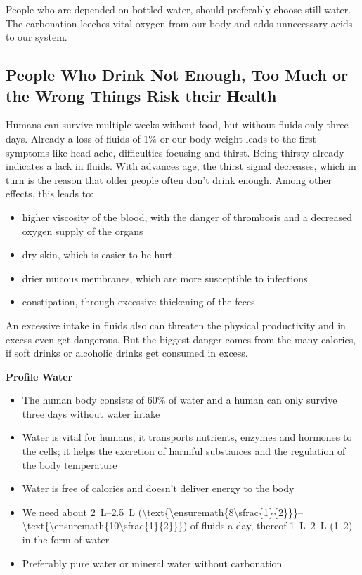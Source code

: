 \documentclass[../main.tex]{subfiles}
\begin{document}
People who are depended on bottled water, should preferably choose still water.
  The carbonation leeches vital oxygen from our body and adds unnecessary acids to our system.

  \subsection[Drinking Too Little, Too Much or the Wrong Drinks]{People Who Drink Not Enough, Too Much or the Wrong Things Risk their Health}

  Humans can survive multiple weeks without food, but without fluids only three days.
  Already a loss of fluids of 1\% or our body weight leads to the first symptoms like head ache, difficulties focusing and thirst.
  Being thirsty already indicates a lack in fluids.
  With advances age, the thirst signal decreases, which in turn is the reason that older people often don't drink enough.
  Among other effects, this leads to:
  \begin{itemize}
  \item higher viscosity of the blood, with the danger of thrombosis and a decreased oxygen supply of the organs
  \item dry skin, which is easier to be hurt
  \item drier mucous membranes, which are more susceptible to infections
    \item constipation, through excessive thickening of the feces
    \end{itemize}

    An excessive intake in fluids also can threaten the physical productivity and in excess even get dangerous.
    But the biggest danger comes from the many calories, if soft drinks or alcoholic drinks get consumed in excess. 

 
\vspace{5mm}
\noindent
\begin{fminipage}{\textwidth}
  \textbf{Profile Water}
  \begin{itemize}
  \item The human body consists of 60\% of water and a human can only survive three days without water intake
  \item Water is vital for humans, it transports nutrients, enzymes and hormones to the cells; it helps the excretion of harmful substances and the regulation of the body temperature
  \item Water is free of calories and doesn't deliver energy to the body
  \item We need about \SIrange{2}{2.5}{\L}
    (\SIrange[parse-numbers=false]{\text{\ensuremath{8\sfrac{1}{2}}}}{\text{\ensuremath{10\sfrac{1}{2}}}}{\cup}) of fluids a day, thereof
    \SIrange{1}{2}{\L}
    (\SIrange{1}{2}{\quart}) in the form of water
    \item Preferably pure water or mineral water without carbonation
  \end{itemize}
\end{fminipage}
\end{document}
